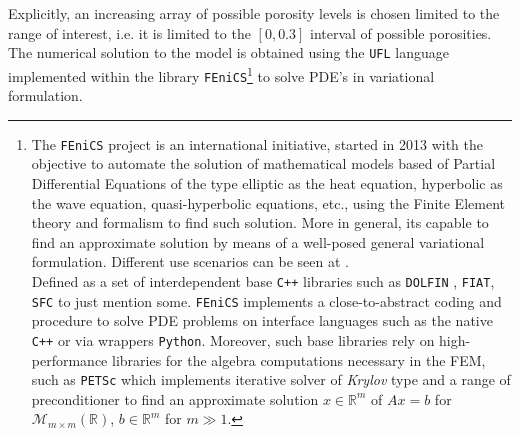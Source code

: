 Explicitly, an increasing array of possible porosity levels is chosen limited to the range of interest, i.e. it is limited to the $[0, 0.3]$ interval of possible porosities. The numerical solution to the model is obtained using the \texttt{UFL} language implemented within the library \texttt{FEniCS}\footnote{The \texttt{FEniCS} project \cite{logg2012automated} is an international initiative, started in 2013 with the objective to automate the solution of mathematical models based of Partial Differential Equations of the type elliptic as the heat equation, hyperbolic as the wave equation, quasi-hyperbolic equations, etc., using the Finite Element theory and formalism to find such solution. More in general, its capable to find an approximate solution by means of a well-posed general variational formulation. Different use scenarios can be seen at \cite{abali2016computational}.\\
Defined as a set of interdependent base \texttt{C++} libraries such as \texttt{DOLFIN} \cite{LoggWells2010a}, \texttt{FIAT}, \texttt{SFC} to just mention some. \texttt{FEniCS} implements a close-to-abstract coding and procedure to solve PDE problems on interface languages such as the native \texttt{C++} or via wrappers \texttt{Python}. Moreover, such base libraries rely on high-performance libraries for the algebra computations necessary in the FEM, such as \texttt{PETSc} which implements iterative solver of \textit{Krylov} type and a range of preconditioner to find an approximate solution $x \in \mathbb{R}^m$ of $Ax = b$ for $\mathcal{M}_{m \times m}(\mathbb{R})$, $b \in \mathbb{R}^m$ for $m \gg 1$.} to solve PDE's in variational formulation. 


